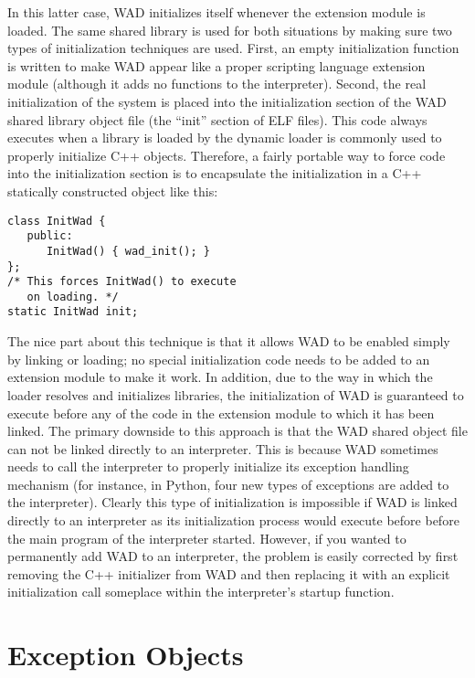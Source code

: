 In this latter case, WAD initializes itself whenever the extension module is
loaded.  The same shared library is used for both situations by making
sure two types of initialization techniques are used.  First, an empty
initialization function is written to make WAD appear like a proper
scripting language extension module (although it adds no functions to
the interpreter).  Second, the real initialization of the system is
placed into the initialization section of the WAD shared library
object file (the ``init'' section of ELF files).  This code always executes
when a library is loaded by the dynamic loader is commonly used to
properly initialize C++ objects.  Therefore, a fairly portable way
to force code into the initialization section is to encapsulate the
initialization in a C++ statically constructed object like this:

\begin{verbatim}
class InitWad {
   public:
      InitWad() { wad_init(); }
};
/* This forces InitWad() to execute
   on loading. */
static InitWad init;
\end{verbatim}

The nice part about this technique is that it allows WAD to be enabled
simply by linking or loading; no special initialization code needs to
be added to an extension module to make it work.  In addition, due to
the way in which the loader resolves and initializes libraries, the
initialization of WAD is guaranteed to execute before any of the code
in the extension module to which it has been linked.  The primary
downside to this approach is that the WAD shared object file can not be
linked directly to an interpreter.   This is because WAD sometimes needs to call the
interpreter to properly initialize its exception handling mechanism (for instance, in Python,
four new types of exceptions are added to the interpreter).  Clearly this type of initialization
is impossible if WAD is linked directly to an interpreter as 
its initialization process would execute before before the main program of the
interpreter started.  However, 
if you wanted to permanently add WAD to an interpreter, the problem is easily
corrected by first removing the C++ initializer from WAD and then replacing it with an explicit
initialization call someplace within the interpreter's startup function.

\section{Exception Objects}

